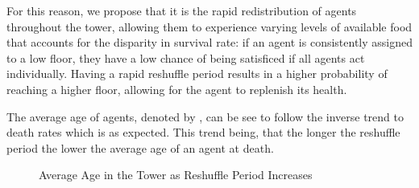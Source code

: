 For this reason, we propose that it is the rapid redistribution of agents throughout the tower, allowing them to experience varying levels of available food that accounts for the disparity in survival rate: if an agent is consistently assigned to a low floor, they have a low chance of being satisficed if all agents act individually. Having a rapid reshuffle period results in a higher probability of reaching a higher floor, allowing for the agent to replenish its health. 

The average age of agents, denoted by , can be see to follow the inverse trend to death rates which is as expected. This trend being, that the longer the reshuffle period the lower the average age of an agent at death. 
\begin{figure}[H] %
    \centering
    \begin{minipage}{0.8\textwidth}
    \end{minipage}
    \caption{Average Age in the Tower as Reshuffle Period Increases}
    \label{fig:Average-Age-as-Shuffle-Period-Decreases}
\end{figure}

